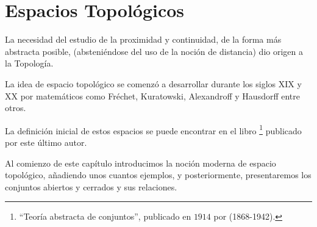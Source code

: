 

\chapter{Espacios Topológicos}
\label{etop}
La necesidad del estudio de la proximidad y continuidad, de la forma más abstracta posible, (absteniéndose del uso de la noción de distancia) dio origen a la Topología.

La idea de espacio topológico se comenzó a desarrollar durante los siglos XIX y XX por matemáticos como Fréchet, Kuratowski, Alexandroff y Hausdorff entre otros.

La definición inicial de estos espacios se puede encontrar en el libro \footnote{``Teoría abstracta de conjuntos'', publicado en $1914$ por (1868-1942).} publicado por este último autor.


Al comienzo de este capítulo introducimos la noción moderna de espacio topológico, añadiendo unos cuantos ejemplos, y posteriormente, presentaremos los conjuntos abiertos y cerrados y sus relaciones.%
